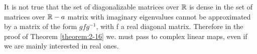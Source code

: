 It is not true that the set of diagonalizable matrices over $\mathbb{R}$ is dense in the set of
matrices over $\mathbb{R} - a$ matrix with imaginary eigenvalues cannot be approximated
by a matrix of the form $gfg^{-1}$, with f a real diagonal matrix. Therefore in the
proof of Theorem \ref{theorem:2-16} we. must pass to complex linear maps, even if we are
mainly interested in real ones.